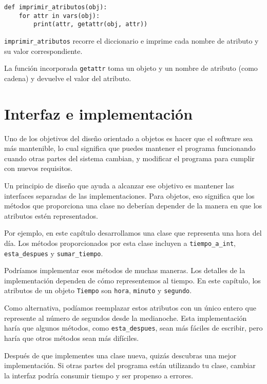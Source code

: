 \documentclass[10pt]{book}
\begin{document}
\begin{verbatim}
def imprimir_atributos(obj):
    for attr in vars(obj):
        print(attr, getattr(obj, attr))
\end{verbatim}
%
\verb"imprimir_atributos" recorre el diccionario
e imprime cada nombre de atributo y su valor correspondiente.

La función incorporada {\tt getattr} toma un objeto y un nombre
de atributo (como cadena) y devuelve el valor del atributo.


\section{Interfaz e implementación}

Uno de los objetivos del diseño orientado a objetos es hacer que el software sea más
mantenible, lo cual significa que puedes mantener el programa funcionando cuando
otras partes del sistema cambian, y modificar el programa para cumplir con nuevos
requisitos.

Un principio de diseño que ayuda a alcanzar ese objetivo es mantener
las interfaces separadas de las implementaciones.  Para objetos, eso significa
que los métodos que proporciona una clase no deberían depender de la manera en que los
atributos estén representados.

Por ejemplo, en este capítulo desarrollamos una clase que representa
una hora del día.  Los métodos proporcionados por esta clase incluyen a
\verb"tiempo_a_int", \verb"esta_despues" y \verb"sumar_tiempo".

Podríamos implementar esos métodos de muchas maneras.  Los detalles de la
implementación dependen de cómo representemos al tiempo.  En este capítulo, los
atributos de un objeto {\tt Tiempo} son {\tt hora}, {\tt minuto} y
{\tt segundo}.

Como alternativa, podíamos reemplazar estos atributos con
un único entero que represente al número de segundos
desde la medianoche.  Esta implementación haría que algunos métodos,
como \verb"esta_despues", sean más fáciles de escribir, pero haría que otros métodos sean
más difíciles.

Después de que implementes una clase nueva, quizás descubras una mejor
implementación.  Si otras partes del programa están utilizando tu
clase, cambiar la interfaz podría consumir tiempo y ser propenso a
errores.
\end{document}
